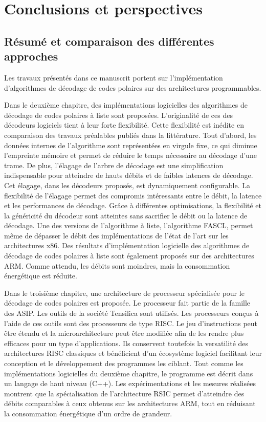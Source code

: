 \chapter*{Conclusions et perspectives}

\section*{Résumé et comparaison des différentes approches}

Les travaux présentés dans ce manuscrit portent sur l'implémentation d'algorithmes de décodage de codes polaires sur des architectures programmables.

Dans le deuxième chapitre, des implémentations logicielles des algorithmes de décodage de codes polaires à liste sont proposées. L'originalité de ces des décodeurs logiciels tient à leur forte flexibilité. Cette flexibilité est inédite en comparaison des travaux préalables publiés dans la littérature. Tout d'abord, les données internes de l'algorithme sont représentées en virgule fixe, ce qui diminue l'empreinte mémoire et permet de réduire le temps nécessaire au décodage d'une trame. De plus, l'élagage de l'arbre de décodage est une simplification indispensable pour atteindre de hauts débits et de faibles latences de décodage. Cet élagage, dans les décodeurs proposés, est dynamiquement configurable. La flexibilité de l'élagage permet des compromis intéressants entre le débit, la latence et les performances de décodage. Grâce à différentes optimisations, la flexibilité et la généricité du décodeur sont atteintes sans sacrifier le débit ou la latence de décodage. Une des versions de l'algorithme à liste, l'algorithme FASCL, permet même de dépasser le débit des implémentations de l'état de l'art sur les architectures x86. Des résultats d'implémentation logicielle des algorithmes de décodage de codes polaires à liste sont également proposés sur des architectures ARM. Comme attendu, les débits sont moindres, mais la consommation énergétique est réduite.

Dans le troisième chapitre, une architecture de processeur spécialisée pour le décodage de codes polaires est proposée. Le processeur fait partie de la famille des ASIP. Les outils de la société Tensilica sont utilisés. Les processeurs conçus à l'aide de ces outils sont des processeurs de type RISC. Le jeu d'instructions peut être étendu et la microarchitecture peut être modifiée afin de les rendre plus efficaces pour un type d'applications. Ils conservent toutefois la versatilité des architectures RISC classiques et bénéficient d'un écosystème logiciel facilitant leur conception et le développement des programmes les ciblant. Tout comme les implémentations logicielles du deuxième chapitre, le programme est décrit dans un langage de haut niveau (C++). Les expérimentations et les mesures réalisées montrent que la spécialisation de l'architecture RSIC permet d'atteindre des débits comparables à ceux obtenus sur les architectures ARM, tout en réduisant la consommation énergétique d'un ordre de grandeur.


